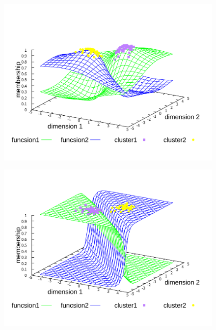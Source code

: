 \documentclass[a4j,12pt,dvipdfmx,oneside]{jsbook}
\theoremstyle{definition}
\begin{document}
  \begin{figure}[p]
   \centering
   \begin{minipage}{0.43\hsize}
    \includegraphics[width=\linewidth]{qFCMA-Em2-Lambda1.pdf}
    \label{fig:qFCMA-Em2-Lambda1}
   \end{minipage}
   \begin{minipage}{0.43\hsize}
    \includegraphics[width=\linewidth]{qFCMA-Em11-Lambda1.pdf}
    \label{fig:qFCMA-Em11-Lambda1}
   \end{minipage}
   \begin{minipage}{0.43\hsize}

\end{minipage}
\end{figure}
\end{document}
